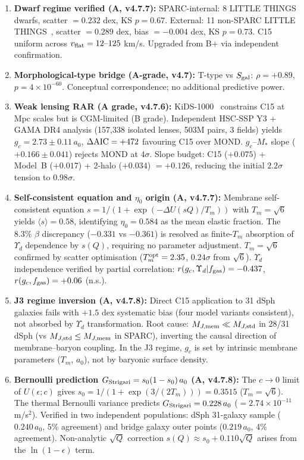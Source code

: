 \documentclass[11pt,a4paper]{article}
\newcommand{\e}[1]{\times 10^{#1}}
\newcommand{\gc}{g_{c}}
\newcommand{\ao}{a_{0}}
\newcommand{\vflat}{v_{\rm flat}}
\newcommand{\Yd}{\Upsilon_{d}}
\newcommand{\Tm}{T_{m}}
\newcommand{\so}{s_{0}}
\newcommand{\Mjmem}{M_{J,{\rm mem}}}
\newcommand{\Mjstd}{M_{J,{\rm std}}}
\newcommand{\fgas}{f_{\rm gas}}
\newcommand{\Sgal}{S_{\rm gal}}
\newcommand{\Gstr}{G_{\rm Strigari}}
\newcommand{\AIC}{\Delta{\rm AIC}}
\begin{document}
\begin{enumerate}[leftmargin=*,itemsep=4pt,label=\textbf{\arabic*.}]
\item \textbf{Dwarf regime verified (A, v4.7.7):} SPARC-internal: 8 LITTLE THINGS dwarfs, scatter $= 0.232$
dex, KS $p = 0.67$. External: 11 non-SPARC LITTLE THINGS~\citep{Oh2015}, scatter $= 0.289$ dex, bias
$= -0.004$ dex, KS $p = 0.73$. C15 uniform across $\vflat = 12\text{--}125$ km/s. Upgraded from B$+$ via
independent confirmation.

\item \textbf{Morphological-type bridge (A-grade, v4.7):} T-type vs $\Sgal$: $\rho = +0.89$,
$p = 4\e{-60}$. Conceptual correspondence; no additional predictive power.

\item \textbf{Weak lensing RAR (A grade, v4.7.6):} KiDS-1000~\citep{Brouwer2021} constrains C15 at Mpc
scales but is CGM-limited (B grade). Independent HSC-SSP Y3 + GAMA DR4 analysis (157{,}338 isolated lenses,
503M pairs, 3 fields) yields $\gc = 2.73 \pm 0.11\,\ao$, $\AIC = +472$ favouring C15 over MOND.
$\gc$--$M_\ast$ slope ($+0.166 \pm 0.041$) rejects MOND at $4\sigma$. Slope budget: C15 ($+0.075$) + Model~B
($+0.017$) + 2-halo ($+0.034$) $= +0.126$, reducing the initial $2.2\sigma$ tension to $0.98\sigma$.

\item \textbf{Self-consistent equation and $\eta_0$ origin (A, v4.7.7):} Membrane self-consistent equation
$s = 1/(1 + \exp(-\Delta U(sQ)/\Tm))$ with $\Tm = \sqrt{6}$ yields $\langle s \rangle = 0.58$, identifying
$\eta_0 = 0.584$ as the mean elastic fraction. The 8.3\% $\beta$ discrepancy ($-0.331$ vs $-0.361$) is
resolved as finite-$\Tm$ absorption of $\Yd$ dependence by $s(Q)$, requiring no parameter adjustment.
$\Tm = \sqrt{6}$ confirmed by scatter optimisation ($\Tm^{\rm opt} = 2.35$, $0.24\sigma$ from $\sqrt{6}$).
$\Yd$ independence verified by partial correlation: $r(\gc, \Yd | \fgas) = -0.437$, $r(\gc, \fgas) = +0.06$
(n.s.).

\item \textbf{J3 regime inversion (A, v4.7.8):} Direct C15 application to 31 dSph galaxies fails with $+1.5$
dex systematic bias (four model variants consistent), not absorbed by $\Yd$ transformation. Root cause:
$\Mjmem \ll \Mjstd$ in 28/31 dSph (vs $\Mjstd \le \Mjmem$ in SPARC), inverting the causal direction of
membrane--baryon coupling. In the J3 regime, $\gc$ is set by intrinsic membrane parameters ($\Tm$, $\ao$),
not by baryonic surface density.

\item \textbf{Bernoulli prediction $\Gstr = \so(1 - \so)\,\ao$ (A, v4.7.8):} The $c \to 0$ limit of
$U(\epsilon; c)$ gives $\so = 1/(1 + \exp(3/(2\Tm))) = 0.3515$ ($\Tm = \sqrt{6}$). The thermal Bernoulli
variance predicts $\Gstr = 0.228\,\ao$ ($= 2.74\e{-11}$ m/s$^2$). Verified in two independent populations:
dSph 31-galaxy sample ($0.240\,\ao$, 5\% agreement) and bridge galaxy outer points ($0.219\,\ao$, 4\%
agreement). Non-analytic $\sqrt{Q}$ correction $s(Q) \approx \so + 0.110\sqrt{Q}$ arises from the
$\ln(1 - \epsilon)$ term.


\end{enumerate}
\end{document}
